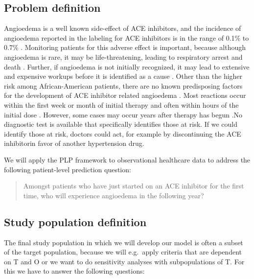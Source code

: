 \documentclass[11pt]{book}
\theoremstyle{definition}
\theoremstyle{definition}
\theoremstyle{definition}
\theoremstyle{remark}
\begin{document}
\hypertarget{problem-definition-2}{%
\subsection{Problem definition}\label{problem-definition-2}}

Angioedema is a well known side-effect of ACE inhibitors, and the incidence of angioedema reported in the labeling for ACE inhibitors is in the range of 0.1\% to 0.7\% \citep{byrd_2006}. Monitoring patients for this adverse effect is important, because although angioedema is rare, it may be life-threatening, leading to respiratory arrest and death \citep{norman_2013}. Further, if angioedema is not initially recognized, it may lead to extensive and expensive workups before it is identified as a cause \citep{norman_2013, thompson_1993}. Other than the higher risk among African-American patients, there are no known predisposing factors for the development of ACE inhibitor related angioedema \citep{byrd_2006}. Most reactions occur within the first week or month of initial therapy and often within hours of the initial dose \citep{circardi_2004}. However, some cases may occur years after therapy has begun \citep{mara_1996}.No diagnostic test is available that specifically identifies those at risk. If we could identify those at risk, doctors could act, for example by discontinuing the ACE inhibitorin favor of another hypertension drug.

We will apply the PLP framework to observational healthcare data to address the following patient-level prediction question:

\begin{quote}
Amongst patients who have just started on an ACE inhibitor for the first time, who will experience angioedema in the following year?
\end{quote}

\hypertarget{study-population-definition}{%
\subsection{Study population definition}\label{study-population-definition}}

The final study population in which we will develop our model is often a subset of the target population, because we will e.g.~apply criteria that are dependent on T and O or we want to do sensitivity analyses with subpopulations of T. For this we have to answer the following questions:
\end{document}
